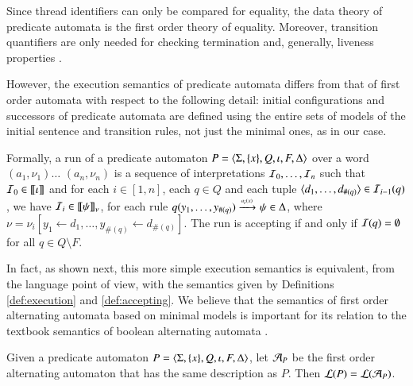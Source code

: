 Since thread identifiers can only be compared for equality, the data
theory of predicate automata is the first order theory of
equality. Moreover, transition quantifiers are only needed for
checking termination and, generally, liveness properties
\cite{Farzan16}.

However, the execution semantics of predicate automata differs from
that of first order automata with respect to the following detail:
initial configurations and successors of predicate automata are
defined using the entire sets of models of the initial sentence and
transition rules, not just the minimal ones, as in our case. 

Formally, a run of a predicate automaton $P =
\langle \Sigma,\{ x \},Q,\iota,F,\Delta \rangle$ over a word $(a_1,\nu_1)
\ldots$ $(a_n,\nu_n)$ is a sequence of interpretations $\mathcal{I}_0, \ldots,
\mathcal{I}_n$ such that $\mathcal{I}_0 \in {\bf [\![} \iota {\bf ]\!]}$ and for each $i \in [1,n]$,
each $q \in Q$ and each tuple $\langle d_1,\ldots,d_{\#(q)} \rangle \in
\mathcal{I}_{i-1}(q)$, we have $\mathcal{I}_i \in {\bf [\![} \psi {\bf ]\!]}_\nu$, for each rule
$q(y_1,\ldots,y_{\#(q)}) \xrightarrow{{\scriptscriptstyle a_i(x)}}_{{\scriptstyle }} \psi \in \Delta$, where
$\nu=\nu_i[y_1\leftarrow d_1, \ldots, y_{\#(q)} \leftarrow
  d_{\#(q)}]$. The run is accepting if and only if $\mathcal{I}(q)=\emptyset$
for all $q \in Q \setminus F$.

In fact, as shown next, this more simple execution semantics is
equivalent, from the language point of view, with the semantics given
by Definitions \ref{def:execution} and \ref{def:accepting}.  We
believe that the semantics of first order alternating automata based
on minimal models is important for its relation to the textbook
semantics of boolean alternating automata
\cite{ChandraKozenStockmeyer81}.

\begin{proposition}
  Given a predicate automaton $P =
  \langle \Sigma,\{ x \},Q,\iota,F,\Delta \rangle$, let $\mathcal{A}_P$ be the
  first order alternating automaton that has the same description as
  $P$. Then ${\mathcal L}({P}) = {\mathcal L}({\mathcal{A}_P})$. 
\end{proposition}

